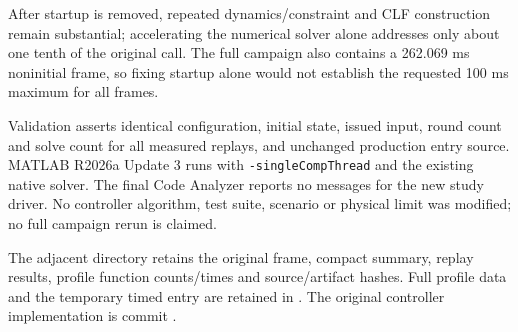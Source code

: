 \documentclass[11pt]{article}
\begin{document}
After startup is removed, repeated dynamics/constraint and CLF construction
remain substantial; accelerating the numerical solver alone addresses only
about one tenth of the original call. The full campaign also contains a
262.069 ms noninitial frame, so fixing startup alone would not establish the
requested 100 ms maximum for all frames.

Validation asserts identical configuration, initial state, issued input,
round count and solve count for all measured replays, and unchanged
production entry source. MATLAB R2026a Update 3 runs with
\texttt{-singleCompThread} and the existing native solver. The final Code
Analyzer reports no messages for the new study driver. No controller
algorithm, test suite, scenario or physical limit was modified; no full
campaign rerun is claimed.

The adjacent  directory retains the original
frame, compact summary, replay results, profile function counts/times and
source/artifact hashes. Full profile data and the temporary timed entry are
retained in .
The original controller implementation is commit
.
\end{document}
